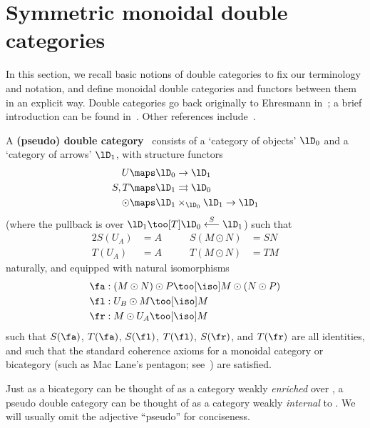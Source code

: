 \section{Symmetric monoidal double categories}
\label{sec:symm-mono-double}

In this section, we recall basic notions of double categories to fix our terminology and notation, and define monoidal double categories and functors between them in an explicit way.
Double categories go back originally to Ehresmann
in~\cite{ehresmann:cat-str}; a brief introduction can be found
in~\cite{ks:r2cats}.  Other references
include~\cite{multi_funct_i,gp:double-limits,gp:double-adjoints,aleiferi2018cartesian}.


\begin{defn}\label{def:dblcat}
  A \textbf{(pseudo) double category} \lD\ consists of a `category of
  objects' $\lD_0$ and a `category of arrows' $\lD_1$, with structure
  functors
  \begin{align*}
    U&\maps \lD_0\to \lD_1\\
    S,T&\maps \lD_1\rightrightarrows \lD_0\\
    \odot&\maps \lD_1\times_{\lD_0}\lD_1\to \lD_1
  \end{align*}
  (where the pullback is over
  $\lD_1\too[T]\lD_0\overset{S}{\longleftarrow} \lD_1$) such that
  \begin{alignat*}{2}
    S(U_A) &= A &\qquad
    S(M\odot N) &= SN\\
    T(U_A) &= A &\qquad
    T(M\odot N) &= TM
  \end{alignat*}
  naturally, and equipped with natural isomorphisms
  \begin{align*}
    \fa &: (M\odot N) \odot P \too[\iso] M \odot (N \odot P)\\
    \fl &: U_B \odot M \too[\iso] M\\
    \fr &: M \odot U_A \too[\iso] M
  \end{align*}
  such that $S(\fa)$, $T(\fa)$, $S(\fl)$, $T(\fl)$, $S(\fr)$, and
  $T(\fr)$ are all identities, and such that the standard coherence
  axioms for a monoidal category or bicategory (such as Mac Lane's
  pentagon; see~\cite{maclane}) are satisfied.
\end{defn}

Just as a bicategory can be thought of as a category weakly
\emph{enriched} over \cCat, a pseudo double category can be thought of
as a category weakly \emph{internal} to \cCat.  We will usually omit
the adjective ``pseudo'' for conciseness.

